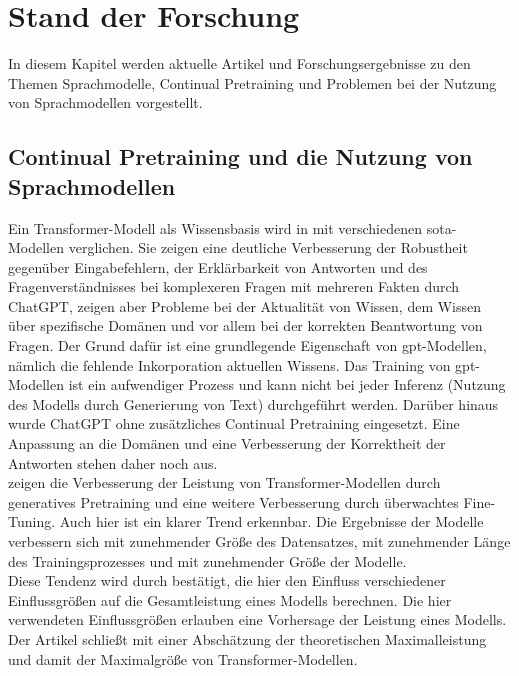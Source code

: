 \chapter{Stand der Forschung}\label{ch:relatedWork}
In diesem Kapitel werden aktuelle Artikel und Forschungsergebnisse zu den Themen Sprachmodelle, Continual Pretraining und Problemen bei der Nutzung von Sprachmodellen vorgestellt.

\section{Continual Pretraining und die Nutzung von Sprachmodellen}
Ein Transformer-Modell als Wissensbasis wird in \citet{chatgpt_qas} mit verschiedenen \ac{sota}-Modellen verglichen.
Sie zeigen eine deutliche Verbesserung der Robustheit gegenüber Eingabefehlern, der Erklärbarkeit von Antworten und des Fragenverständnisses bei komplexeren Fragen mit mehreren Fakten durch ChatGPT,
zeigen aber Probleme bei der Aktualität von Wissen, dem Wissen über spezifische Domänen und vor allem bei der korrekten Beantwortung von Fragen.
Der Grund dafür ist eine grundlegende Eigenschaft von \ac{gpt}-Modellen, nämlich die fehlende Inkorporation aktuellen Wissens.
Das Training von \ac{gpt}-Modellen ist ein aufwendiger Prozess und kann nicht bei jeder Inferenz (Nutzung des Modells durch Generierung von Text) durchgeführt werden.
Darüber hinaus wurde ChatGPT ohne zusätzliches Continual Pretraining eingesetzt.
Eine Anpassung an die Domänen und eine Verbesserung der Korrektheit der Antworten stehen daher noch aus.\\

\citet{gpt1} zeigen die Verbesserung der Leistung von Transformer-Modellen durch generatives Pretraining und eine weitere Verbesserung durch überwachtes Fine-Tuning.
Auch hier ist ein klarer Trend erkennbar.
Die Ergebnisse der Modelle verbessern sich mit zunehmender Größe des Datensatzes, mit zunehmender Länge des Trainingsprozesses und mit zunehmender Größe der Modelle.\\

Diese Tendenz wird durch \citet{scaling_laws} bestätigt, die hier den Einfluss verschiedener Einflussgrößen auf die Gesamtleistung eines Modells berechnen.
Die hier verwendeten Einflussgrößen erlauben eine Vorhersage der Leistung eines Modells.
Der Artikel schließt mit einer Abschätzung der theoretischen Maximalleistung und damit der Maximalgröße von Transformer-Modellen.\\


